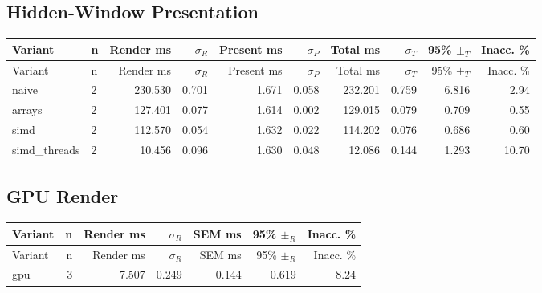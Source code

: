 \documentclass[11pt]{article}
\begin{document}
\subsection*{Hidden-Window Presentation}
\begin{longtable}{llrrrrrrrr}
Variant & n & Render ms & $\sigma_R$ & Present ms & $\sigma_P$ & Total ms & $\sigma_T$ & 95\% $\pm_T$ & Inacc. \% \\ \hline
\endfirsthead
Variant & n & Render ms & $\sigma_R$ & Present ms & $\sigma_P$ & Total ms & $\sigma_T$ & 95\% $\pm_T$ & Inacc. \% \\ \hline
\endhead
naive & 2 & 230.530 & 0.701 & 1.671 & 0.058 & 232.201 & 0.759 & 6.816 & 2.94 \\
arrays & 2 & 127.401 & 0.077 & 1.614 & 0.002 & 129.015 & 0.079 & 0.709 & 0.55 \\
simd & 2 & 112.570 & 0.054 & 1.632 & 0.022 & 114.202 & 0.076 & 0.686 & 0.60 \\
simd\_threads & 2 & 10.456 & 0.096 & 1.630 & 0.048 & 12.086 & 0.144 & 1.293 & 10.70 \\
\end{longtable}

\subsection*{GPU Render}
\begin{longtable}{lrrrrrr}
Variant & n & Render ms & $\sigma_R$ & SEM ms & 95\% $\pm_R$ & Inacc. \% \\ \hline
\endfirsthead
Variant & n & Render ms & $\sigma_R$ & SEM ms & 95\% $\pm_R$ & Inacc. \% \\ \hline
\endhead
gpu & 3 & 7.507 & 0.249 & 0.144 & 0.619 & 8.24 \\
\end{longtable}
\end{document}
